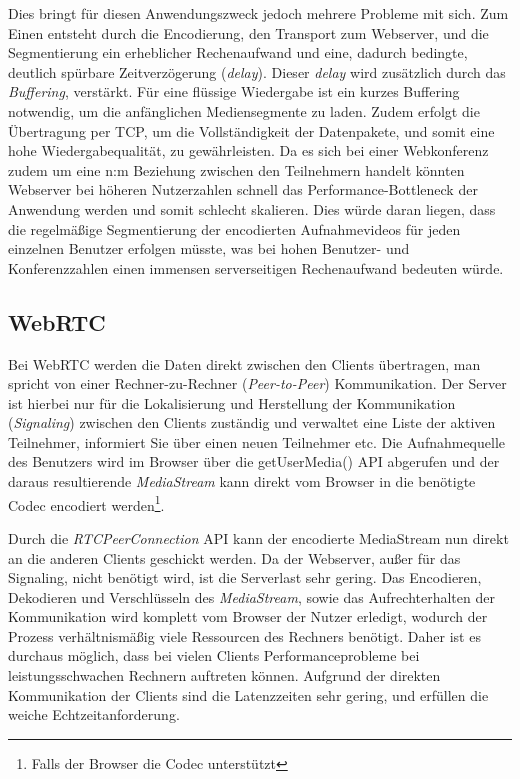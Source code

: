 Dies bringt für diesen Anwendungszweck jedoch mehrere Probleme mit sich.
Zum Einen entsteht durch die Encodierung, den Transport zum Webserver, und die Segmentierung ein erheblicher Rechenaufwand und
eine, dadurch bedingte, deutlich spürbare Zeitverzögerung (\textit{delay}).
Dieser \textit{delay} wird zusätzlich durch das \textit{Buffering}, verstärkt.
Für eine flüssige Wiedergabe ist ein kurzes Buffering notwendig, um die anfänglichen Mediensegmente zu laden\parencite[3.2 Partial Segments]{Pantos2020}.
Zudem erfolgt die Übertragung per TCP, um die Vollständigkeit der Datenpakete, und somit eine hohe Wiedergabequalität,
zu gewährleisten\parencite[4.1 Definition of a Playlist]{Pantos2020}.
Da es sich bei einer Webkonferenz zudem um eine n:m Beziehung zwischen den Teilnehmern handelt
könnten Webserver bei höheren Nutzerzahlen schnell das Performance-Bottleneck der Anwendung werden und somit schlecht skalieren.
Dies würde daran liegen, dass die regelmäßige Segmentierung der encodierten Aufnahmevideos für jeden einzelnen Benutzer erfolgen
müsste, was bei hohen Benutzer- und Konferenzzahlen einen immensen serverseitigen Rechenaufwand bedeuten würde.

\newpage

\subsection{WebRTC}
\label{subsec:vglWebRTC}
Bei WebRTC werden die Daten direkt zwischen den Clients übertragen, man spricht von einer Rechner-zu-Rechner (\textit{Peer-to-Peer}) Kommunikation.
Der Server ist hierbei nur für die Lokalisierung und Herstellung der Kommunikation (\textit{Signaling}) zwischen den Clients zuständig und verwaltet eine Liste der aktiven Teilnehmer,
informiert Sie über einen neuen Teilnehmer etc.
Die Aufnahmequelle des Benutzers wird im Browser über die getUserMedia() API abgerufen und der daraus resultierende \textit{MediaStream}
kann direkt vom Browser in die benötigte Codec encodiert werden\footnote{Falls der Browser die Codec unterstützt}\parencite{MozWebRtcCodecs}.

Durch die \textit{RTCPeerConnection} API kann der encodierte MediaStream nun direkt an die anderen Clients geschickt werden.
Da der Webserver, außer für das Signaling, nicht benötigt wird, ist die Serverlast sehr gering.
Das Encodieren, Dekodieren und Verschlüsseln des \textit{MediaStream}, sowie das Aufrechterhalten der Kommunikation wird komplett
vom Browser der Nutzer erledigt, wodurch der Prozess verhältnismäßig viele Ressourcen des Rechners benötigt\parencite[5. RTP Media API]{W3WebRTC}.
Daher ist es durchaus möglich, dass bei vielen Clients Performanceprobleme bei leistungsschwachen Rechnern auftreten können.
Aufgrund der direkten Kommunikation der Clients sind die Latenzzeiten sehr gering, und erfüllen die weiche Echtzeitanforderung.

